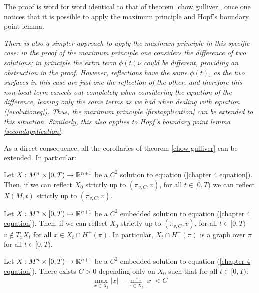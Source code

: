 The proof is word for word identical to that of theorem \ref{chow gulliver}, once one notices that it is possible to apply the maximum principle and Hopf's boundary point lemma. 

\begin{oss}\em
	There is also a simpler approach to apply the maximum principle in this specific case: in the proof of the maximum principle one considers the difference of two solutions; in principle the extra term $\phi(t) \nu$ could be different, providing an obstruction in the proof. However, reflections have the same $\phi(t)$, as the two surfaces in this case are just one the reflection of the other, and therefore this non-local term cancels out completely when considering the equation of the difference, leaving only the same terms as we had when dealing with equation (\ref{evolutioneq}). Thus, the maximum principle \ref{firstapplication} can be extended to this situation. Similarly, this also applies to Hopf's boundary point lemma \ref{secondapplication}. 
\end{oss}

As a direct consequence, all the corollaries of theorem \ref{chow gulliver} can be extended. In particular:


\begin{cor}
	Let $X:M^n\times [0,T) \rightarrow \mathbb{R}^{n+1}$ be a $C^2$ solution to equation (\ref{chapter 4 equation}). Then, if we can reflect $X_0$ strictly up to $(\pi_{v,C},v)$, for all $t\in [0,T)$ we can reflect $X(M, t)$ strictly up to $(\pi_{v,C},v)$. 
\end{cor}

\begin{cor}
	Let $X:M^n\times [0,T) \rightarrow \mathbb{R}^{n+1}$ be a $C^2$ embedded solution to equation (\ref{chapter 4 equation}). Then, if we can reflect $X_0$ strictly up to $(\pi_{v,C},v)$, for all $t\in [0,T)$ $v\notin T_xX_t$ for all $x\in X_t\cap\overline{H^+(\pi)}$. In particular,  $ X_t\cap\overline{H^+(\pi)}$ is a graph over $\pi$ for all $t\in [0,T)$.
\end{cor}


\begin{cor}
	Let $X:M^n\times [0,T) \rightarrow \mathbb{R}^{n+1}$ be a $C^2$ embedded solution to equation (\ref{chapter 4 equation}). There exists $C>0$ depending only on $X_0$ such that for all $t\in[0, T)$: 
	\begin{align*}
		\max_{x\in X_t} |x| - \min_{x\in X_t} |x| < C
	\end{align*}\label{new sandwich estimate}
\end{cor}
 

